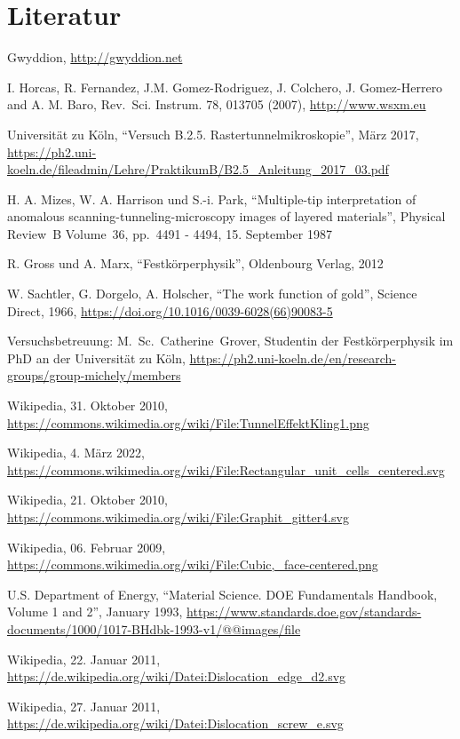 \documentclass[12pt,a4paper]{scrartcl}
\numberwithin{equation}{section} %
\begin{document}
\clearpage
\hypertarget{literatur}{%
\section{Literatur}\label{literatur}}
\begin{thebibliography}{9}
	Gwyddion, \url{http://gwyddion.net}

	I. Horcas, R. Fernandez, J.M. Gomez-Rodriguez, J. Colchero, J. Gomez-Herrero and A. M. Baro, Rev.~Sci. Instrum. 78, 013705 (2007), \url{http://www.wsxm.eu}

	Universität zu Köln, ``Versuch B.2.5. Rastertunnelmikroskopie'', März 2017, 	\url{https://ph2.uni-koeln.de/fileadmin/Lehre/PraktikumB/B2.5_Anleitung_2017_03.pdf}

	H. A. Mizes, W. A. Harrison und S.-i. Park, ``Multiple-tip interpretation of anomalous scanning-tunneling-microscopy images of layered materials'', Physical Review~B Volume~36, pp.~4491 - 4494, 15. September 1987

	R. Gross und A. Marx, ``Festkörperphysik'', Oldenbourg Verlag, 2012

	W. Sachtler, G. Dorgelo, A. Holscher, ``The work function of gold'', Science Direct, 1966,
	\url{https://doi.org/10.1016/0039-6028(66)90083-5}

	Versuchsbetreuung: M.~Sc.~Catherine~Grover, Studentin der Festkörperphysik im PhD an der Universität zu Köln, \url{https://ph2.uni-koeln.de/en/research-groups/group-michely/members}

	Wikipedia, 31. Oktober 2010, \url{https://commons.wikimedia.org/wiki/File:TunnelEffektKling1.png}

	Wikipedia, 4. März 2022, \url{https://commons.wikimedia.org/wiki/File:Rectangular_unit_cells_centered.svg}

	Wikipedia, 21. Oktober 2010, \url{https://commons.wikimedia.org/wiki/File:Graphit_gitter4.svg}

	Wikipedia, 06. Februar 2009, \url{https://commons.wikimedia.org/wiki/File:Cubic,_face-centered.png}

	U.S. Department of Energy, ``Material Science. DOE Fundamentals Handbook, Volume 1 and 2'', January 1993, \url{https://www.standards.doe.gov/standards-documents/1000/1017-BHdbk-1993-v1/@@images/file}

	Wikipedia, 22. Januar 2011, \url{https://de.wikipedia.org/wiki/Datei:Dislocation_edge_d2.svg}

	Wikipedia, 27. Januar 2011, \url{https://de.wikipedia.org/wiki/Datei:Dislocation_screw_e.svg}

\end{thebibliography}
\end{document}
